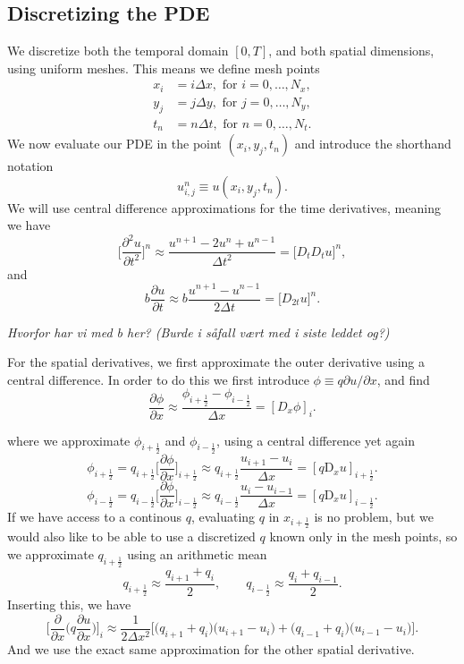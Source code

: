 \documentclass[a4paper, 11pt, notitlepage, english]{article}
\newcommand{\p}{\partial}
\newcommand{\D}{\mbox{D}}
\begin{document}
\subsection*{Discretizing the PDE}
We discretize both the temporal domain $[0,T]$, and both spatial dimensions, using uniform meshes. This means we define mesh points
\begin{align*}
x_i &= i\Delta x, \mbox{ for } i=0,\ldots,N_x, \\
y_j &= j\Delta y, \mbox{ for } j=0,\ldots,N_y, \\
t_n &= n\Delta t, \mbox{ for } n=0,\ldots,N_t.
\end{align*}
We now evaluate our PDE in the point $(x_i, y_j, t_n)$ and introduce the shorthand notation
$$u_{i,j}^n \equiv u(x_i, y_j, t_n).$$
We will use central difference approximations for the time derivatives, meaning we have
$$\bigg[\frac{\p^2 u}{\p t^2}\bigg]^n \approx \frac{u^{n+1} - 2u^n + u^{n-1}}{\Delta t^2} = \bigg[D_tD_t u\bigg]^n,$$
and
$$b\frac{\p u}{\p t} \approx b \frac{u^{n+1}-u^{n-1}}{2\Delta t} = \bigg[D_{2t}u\bigg]^n.$$

\textit{Hvorfor har vi med b her? (Burde i såfall vært med i siste leddet og?)}

For the spatial derivatives, we first approximate the outer derivative using a central difference. In order to do this we first introduce $\phi \equiv q \p u/\p x$, and find
$$\frac{\p \phi}{\p x} \approx \frac{\phi_{i+\frac{1}{2}} - \phi_{i-\frac{1}{2}}}{\Delta x} = [D_x \phi]_{i}.$$

where we approximate $\phi_{i+\frac{1}{2}}$ and $\phi_{i-\frac{1}{2}}$, using a central difference yet again
$$\phi_{i+\frac{1}{2}} = q_{i+\frac{1}{2}}\bigg[\frac{\p \phi}{\p x}\bigg]_{i+\frac{1}{2}} \approx q_{i+\frac{1}{2}} \frac{u_{i+1} - u_{i}}{\Delta x} = [q\D_x u]_{i+\frac{1}{2}}.$$
$$\phi_{i-\frac{1}{2}} = q_{i-\frac{1}{2}}\bigg[\frac{\p \phi}{\p x}\bigg]_{i-\frac{1}{2}} \approx q_{i-\frac{1}{2}} \frac{u_{i} - u_{i-1}}{\Delta x} = [q\D_x u]_{i-\frac{1}{2}}.$$
If we have access to a continous $q$, evaluating $q$ in $x_{i+\frac{1}{2}}$ is no problem, but we would also like to be able to use a discretized $q$ known only in the mesh points, 
so we approximate $q_{i+\frac{1}{2}}$ using an arithmetic mean
$$q_{i+\frac{1}{2}} \approx \frac{q_{i+1} + q_i}{2}, \qquad q_{i-\frac{1}{2}} \approx \frac{q_{i} + q_{i-1}}{2}.$$
Inserting this, we have
$$\bigg[\frac{\p}{\p x}\bigg(q\frac{\p u}{\p x}\bigg)\bigg]_i \approx \frac{1}{2\Delta x^2}\bigg[\big(q_{i+1}+q_i\big)\big(u_{i+1}-u_i\big) + \big(q_{i-1} + q_i\big)\big(u_{i-1}-u_i\big)\bigg].$$
And we use the exact same approximation for the other spatial derivative.
\end{document}
